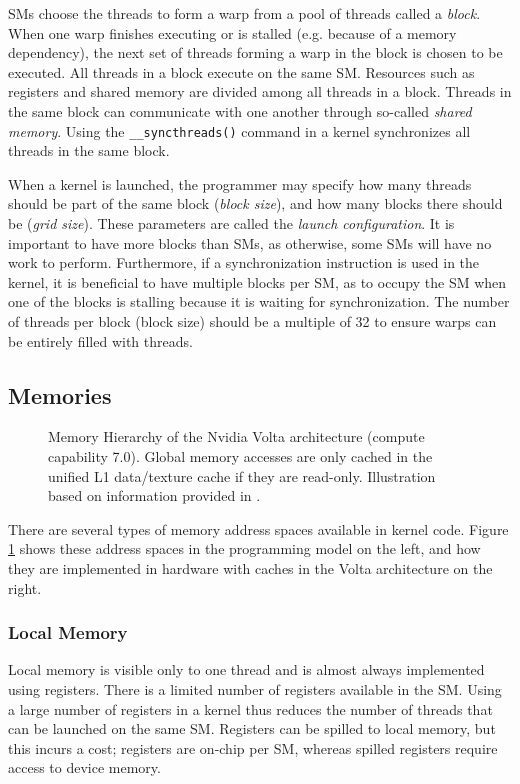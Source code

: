 SMs choose the threads to form a warp from a pool of threads called a \emph{block}. When one warp finishes executing or is stalled (e.g. because of a memory dependency), the next set of threads forming a warp in the block is chosen to be executed. All threads in a block execute on the same SM. Resources such as registers and shared memory are divided among all threads in a block. Threads in the same block can communicate with one another through so-called \emph{shared memory}. Using the \texttt{\_\_syncthreads()} command in a kernel synchronizes all threads in the same block.

When a kernel is launched, the programmer may specify how many threads should be part of the same block (\emph{block size}), and how many blocks there should be (\emph{grid size}). These parameters are called the \emph{launch configuration}. It is important to have more blocks than SMs, as otherwise, some SMs will have no work to perform. Furthermore, if a synchronization instruction is used in the kernel, it is beneficial to have multiple blocks per SM, as to occupy the SM when one of the blocks is stalling because it is waiting for synchronization. The number of threads per block (block size) should be a multiple of 32 to ensure warps can be entirely filled with threads. \cite[Section~10]{cuda-best-practices}

\subsection{Memories} \label{sec:memories}

\begin{figure}
    \makebox[\textwidth][c]{
    }
    \caption{\label{fig:memory-hierarchy} Memory Hierarchy of the Nvidia Volta architecture (compute capability 7.0). Global memory accesses are only cached in the unified L1 data/texture cache if they are read-only. Illustration based on information provided in \cite[Sections 2.3, 5.3.2, H.6]{cuda-programming}.}
\end{figure}

There are several types of memory address spaces available in kernel code. Figure \ref{fig:memory-hierarchy} shows these address spaces in the programming model on the left, and how they are implemented in hardware with caches in the Volta architecture on the right. 

\subsubsection{Local Memory}
Local memory is visible only to one thread and is almost always implemented using registers. There is a limited number of registers available in the SM. Using a large number of registers in a kernel thus reduces the number of threads that can be launched on the same SM. Registers can be spilled to local memory, but this incurs a cost; registers are on-chip per SM, whereas spilled registers require access to device memory.

